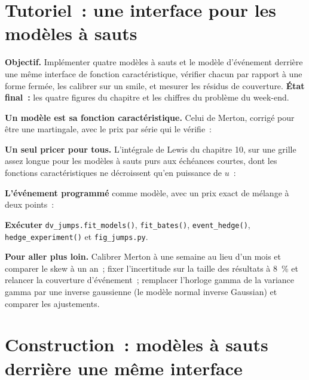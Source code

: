\section{Tutoriel~: une interface pour les modèles à sauts}\label{tut:dv:jumps-and-levy-models:tut}

\begin{tutorial}
\textbf{Objectif.} Implémenter quatre modèles à sauts et le modèle d'événement derrière une même interface de fonction caractéristique,
vérifier chacun par rapport à une forme fermée, les calibrer sur un smile, et mesurer les résidus de couverture. \textbf{État final~:} les
quatre figures du chapitre et les chiffres du problème du week-end.
\begin{tutsteps}
\item \textbf{Un modèle est sa fonction caractéristique.} Celui de Merton, corrigé pour être une martingale, avec le prix par série
qui le vérifie~:
\label{lst:dv:jumps-and-levy-models:merton}
\item \textbf{Un seul pricer pour tous.} L'intégrale de Lewis du chapitre 10, sur une grille assez longue pour les modèles à sauts purs
aux échéances courtes, dont les fonctions caractéristiques ne décroissent qu'en puissance de $u$~:
\label{lst:dv:jumps-and-levy-models:lewis}
\item \textbf{L'événement programmé} comme modèle, avec un prix exact de mélange à deux points~:
\label{lst:dv:jumps-and-levy-models:event}
\item \textbf{Exécuter} \texttt{dv\_jumps.fit\_models()}, \texttt{fit\_bates()}, \texttt{event\_hedge()},
\texttt{hedge\_experiment()} et \texttt{fig\_jumps.py}.
\end{tutsteps}
\textbf{Pour aller plus loin.} Calibrer Merton à une semaine au lieu d'un mois et comparer le skew à un an~; fixer
l'incertitude sur la taille des résultats à 8~\% et relancer la couverture d'événement~; remplacer l'horloge gamma de la variance gamma par une
inverse gaussienne (le modèle normal inverse Gaussian) et comparer les ajustements.
\end{tutorial}

\section{Construction~: modèles à sauts derrière une même interface}\label{bld:dv:jumps-and-levy-models:jumps}

